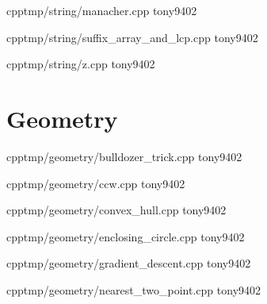 {}
{}
{}
{cpp}{tmp/string/manacher.cpp}
{tony9402}



{}
{}
{}
{cpp}{tmp/string/suffix_array_and_lcp.cpp}
{tony9402}



{}
{}
{}
{cpp}{tmp/string/z.cpp}
{tony9402}


\section{Geometry}


{}
{}
{}
{cpp}{tmp/geometry/bulldozer_trick.cpp}
{tony9402}



{}
{}
{}
{cpp}{tmp/geometry/ccw.cpp}
{tony9402}



{}
{}
{}
{cpp}{tmp/geometry/convex_hull.cpp}
{tony9402}



{}
{}
{}
{cpp}{tmp/geometry/enclosing_circle.cpp}
{tony9402}



{}
{}
{}
{cpp}{tmp/geometry/gradient_descent.cpp}
{tony9402}



{}
{}
{}
{cpp}{tmp/geometry/nearest_two_point.cpp}
{tony9402}
